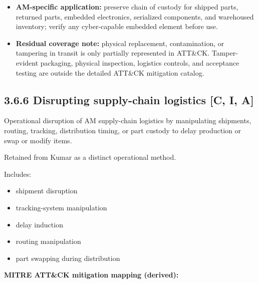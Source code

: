 \documentclass[10pt,a4paper,oneside]{report}
\begin{document}
\begin{itemize}
\item \textbf{AM-specific application:} preserve chain of custody for shipped parts, returned parts, embedded electronics, serialized components, and warehoused inventory; verify any cyber-capable embedded element before use.
\end{itemize}

\begin{itemize}
\item \textbf{Residual coverage note:} physical replacement, contamination, or tampering in transit is only partially represented in ATT\&CK. Tamper-evident packaging, physical inspection, logistics controls, and acceptance testing are outside the detailed ATT\&CK mitigation catalog.
\end{itemize}


\subsection{3.6.6 Disrupting supply-chain logistics [C, I, A]}


Operational disruption of AM supply-chain logistics by manipulating shipments, routing, tracking, distribution timing, or part custody to delay production or swap or modify items.

Retained from Kumar as a distinct operational method.

Includes:

\begin{itemize}
\item shipment disruption
\item tracking-system manipulation
\item delay induction
\item routing manipulation
\item part swapping during distribution
\end{itemize}

\textbf{MITRE ATT\&CK mitigation mapping (derived):}
\end{document}

